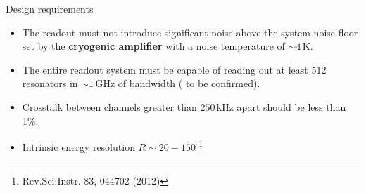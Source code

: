 \documentclass[ignorenonframetext,12pt]{beamer}
\begin{document}
\begin{frame}{Design requirements}
				\begin{itemize}
								\item The readout must not introduce significant noise above the
												system noise floor set by the \textbf{cryogenic
												amplifier} with a noise temperature of $\sim
												4\,\text{K}$.
								\item The entire readout system must be capable of
												reading out at least \alert{512 resonators} in $\sim
												1\,\text{GHz}$ of bandwidth ({\color{red} to be
												confirmed}).
								\item \alert{Crosstalk} between channels greater than
												$250\,\text{kHz}$ apart should be less than \alert{1\%}.
								\item Intrinsic energy resolution \alert{$R \sim 20-150$}
												\footnote{Rev.Sci.Instr. 83, 044702 (2012)}
				\end{itemize}
\end{frame}
\end{document}
